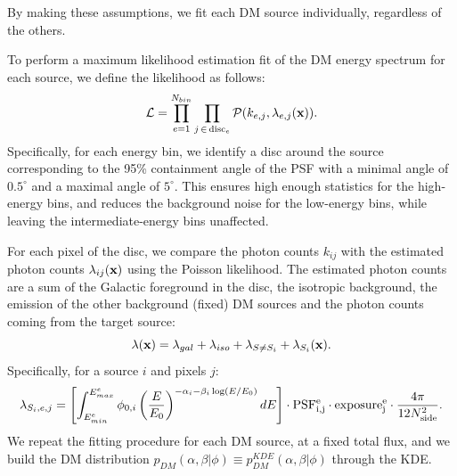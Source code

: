 By making these assumptions, we fit each DM source individually, regardless of the others.

To perform a maximum likelihood estimation fit of the DM energy spectrum for each source, we define the likelihood as follows:
\begin{equation}
    \mathcal{L} = \prod_{e=1}^{N_{bin}} \prod_{j \, \in \, {\rm disc}_e}  
    \mathcal{P}(k_{e,j}, \lambda_{e,j}(\textbf{x})).
\end{equation}
Specifically, for each energy bin, we identify a disc around the source corresponding to the 95\% containment angle of the PSF with a minimal angle of $0.5^\circ$ and a maximal angle of $5^\circ$.
This ensures high enough statistics for the high-energy bins, and reduces the background noise for the low-energy bins, while leaving the intermediate-energy bins unaffected. 


For each pixel of the disc, we compare the photon counts $k_{ij}$ with the estimated photon counts $\lambda_{ij}(\textbf{x})$ using the Poisson likelihood. The estimated photon counts are a sum of the Galactic foreground in the disc, the isotropic background, the emission of the other background (fixed) DM sources and the photon counts coming from the target source:
\begin{equation}
    \lambda(\textbf{x}) = \lambda_{gal} + \lambda_{iso} + \lambda_{S \neq S_i} + \lambda_{S_i}(\textbf{x}).
\end{equation}
Specifically, for a source $i$ and pixels $j$:
\begin{equation}
    \lambda_{S_i, e,j} = \left[\int_{E_{min}^e}^{E_{max}^e} \phi_{0,i}\left(\frac{E}{E_0}\right)^{-\alpha_i - \beta_i\log(E/E_0)} dE\right] \cdot {\rm PSF_{i,j}^e} \cdot {\rm exposure_{j}^e} \cdot \frac{4\pi}{12 N_{\rm side}^2}.
    \label{eq:lambda}
\end{equation}
We repeat the fitting procedure for each DM source, at a fixed total flux, and we build the DM distribution $p_{DM}(\alpha, \beta|\phi)\equiv p_{DM}^{KDE}(\alpha, \beta|\phi)$ through the KDE.
